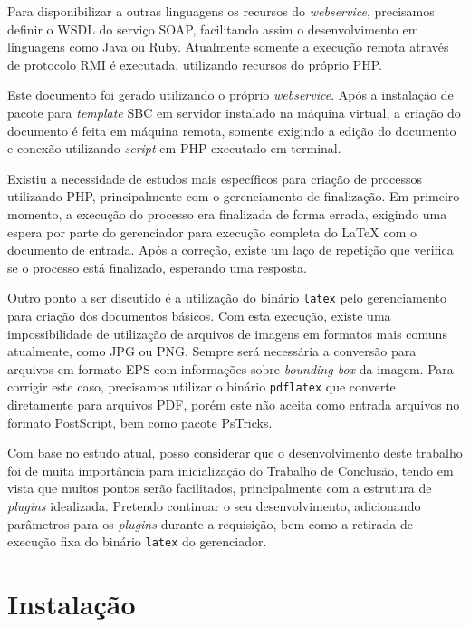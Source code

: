 \documentclass{article}
\begin{document}
Para disponibilizar a outras linguagens os recursos do \emph{webservice},
precisamos definir o WSDL do serviço SOAP, facilitando assim o desenvolvimento
em linguagens como Java ou Ruby. Atualmente somente a execução remota através de
protocolo RMI é executada, utilizando recursos do próprio PHP.

Este documento foi gerado utilizando o próprio \emph{webservice}. Após a
instalação de pacote para \emph{template} SBC em servidor instalado na máquina
virtual, a criação do documento é feita em máquina remota, somente exigindo a
edição do documento e conexão utilizando \emph{script} em PHP executado em
terminal.

Existiu a necessidade de estudos mais específicos para criação de processos
utilizando PHP, principalmente com o gerenciamento de finalização. Em primeiro
momento, a execução do processo era finalizada de forma errada, exigindo uma
espera por parte do gerenciador para execução completa do \LaTeX{} com o
documento de entrada. Após a correção, existe um laço de repetição que verifica
se o processo está finalizado, esperando uma resposta.

Outro ponto a ser discutido é a utilização do binário \texttt{latex} pelo
gerenciamento para criação dos documentos básicos. Com esta execução, existe uma
impossibilidade de utilização de arquivos de imagens em formatos mais comuns
atualmente, como JPG ou PNG. Sempre será necessária a conversão para arquivos em
formato EPS com informações sobre \emph{bounding box} da imagem. Para corrigir
este caso, precisamos utilizar o binário \texttt{pdflatex} que converte
diretamente para arquivos PDF, porém este não aceita como entrada arquivos no
formato PostScript, bem como pacote PsTricks.

Com base no estudo atual, posso considerar que o desenvolvimento deste trabalho
foi de muita importância para inicialização do Trabalho de Conclusão, tendo em
vista que muitos pontos serão facilitados, principalmente com a estrutura de
\emph{plugins} idealizada. Pretendo continuar o seu desenvolvimento, adicionando
parâmetros para os \emph{plugins} durante a requisição, bem como a retirada de
execução fixa do binário \texttt{latex} do gerenciador.

\section{Instalação}
\end{document}
